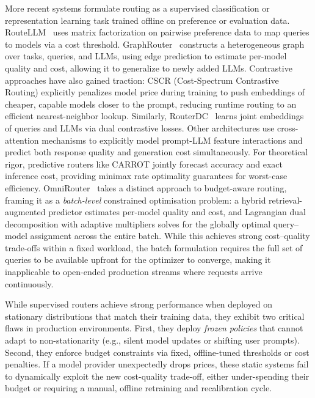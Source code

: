 More recent systems formulate routing as a supervised classification or representation learning task trained offline on preference or evaluation data. RouteLLM~\cite{ong2024routellm} uses matrix factorization on pairwise preference data to map queries to models via a cost threshold. GraphRouter~\cite{feng2025graphrouter} constructs a heterogeneous graph over tasks, queries, and LLMs, using edge prediction to estimate per-model quality and cost, allowing it to generalize to newly added LLMs. Contrastive approaches have also gained traction: CSCR (Cost-Spectrum Contrastive Routing) explicitly penalizes model price during training to push embeddings of cheaper, capable models closer to the prompt, reducing runtime routing to an efficient nearest-neighbor lookup. Similarly, RouterDC~\cite{chen2024routerdc} learns joint embeddings of queries and LLMs via dual contrastive losses. Other architectures use cross-attention mechanisms to explicitly model prompt-LLM feature interactions and predict both response quality and generation cost simultaneously. For theoretical rigor, predictive routers like CARROT jointly forecast accuracy and exact inference cost, providing minimax rate optimality guarantees for worst-case efficiency.  OmniRouter~\cite{ma2025omnirouter} takes a distinct approach to budget-aware routing, framing it as a \emph{batch-level} constrained optimisation problem: a hybrid retrieval-augmented predictor estimates per-model quality and cost, and Lagrangian dual decomposition with adaptive multipliers solves for the globally optimal query--model assignment across the entire batch.  While this achieves strong cost--quality trade-offs within a fixed workload, the batch formulation requires the full set of queries to be available upfront for the optimizer to converge, making it inapplicable to open-ended production streams where requests arrive continuously.

While supervised routers achieve strong performance when deployed on stationary distributions that match their training data, they exhibit two critical flaws in production environments. First, they deploy \emph{frozen policies} that cannot adapt to non-stationarity (e.g., silent model updates or shifting user prompts). Second, they enforce budget constraints via fixed, offline-tuned thresholds or cost penalties. If a model provider unexpectedly drops prices, these static systems fail to dynamically exploit the new cost-quality trade-off, either under-spending their budget or requiring a manual, offline retraining and recalibration cycle.

